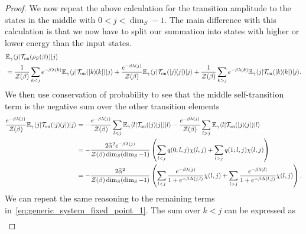 \documentclass{article}
\newcommand{\on}{\rm on}
\newcommand{\ket}[1]{|#1\rangle}
\newcommand{\bra}[1]{\langle #1|}
\newcommand{\ketbra}[2]{| #1\rangle\! \langle #2|}
\newcommand{\partfun}{\mathcal{Z}}
\begin{document}
\begin{proof}
We now repeat the above calculation for the transition amplitude to the states in the middle with $0 < j < \dim_S - 1$. The main difference with this calculation is that we now have to split our summation into states with higher or lower energy than the input states. 
\begin{align}
    &\mathbb{E}_{\gamma} \bra{j} \mathcal{T}_{\on}(\rho_S(\beta)) \ket{j} \nonumber \\
    &= \frac{1}{\partfun(\beta)} \sum_{k < j} e^{-\beta \lambda(k)} \mathbb{E}_{\gamma} \bra{j} \mathcal{T}_{\on}(\ketbra{k}{k}) \ket{j} + \frac{e^{-\beta \lambda(j)}}{\partfun(\beta)} \mathbb{E}_{\gamma}\bra{j} \mathcal{T}_{\on} (\ketbra{j}{j}) \ket{j} + \frac{1}{\partfun(\beta)} \sum_{k > j} e^{-\beta \lambda(k)} \mathbb{E}_{\gamma} \bra{j} \mathcal{T}_{\on} (\ketbra{k}{k}) \ket{j}. \label{eq:generic_system_fixed_point_1}
\end{align}
We then use conservation of probability to see that the middle self-transition term is the negative sum over the other transition elements
\begin{align}
    \frac{e^{-\beta \lambda(j)}}{\partfun(\beta)} \mathbb{E}_{\gamma}\bra{j} \mathcal{T}_{\on} (\ketbra{j}{j}) \ket{j} &= - \frac{e^{-\beta \lambda(j)}}{\partfun(\beta)} \sum_{l < j} \mathbb{E}_{\gamma} \bra{l} \mathcal{T}_{\on} (\ketbra{j}{j}) \ket{l} - \frac{e^{-\beta \lambda(j)}}{\partfun(\beta)} \sum_{l > j} \mathbb{E}_{\gamma} \bra{l} \mathcal{T}_{\on} (\ketbra{j}{j}) \ket{l} \\
    &= -  \frac{2 \widetilde{\alpha}^2 e^{-\beta \lambda(j)} }{\partfun(\beta) \dim_S(\dim_S - 1)} \left( \sum_{l < j} q(0; l, j) \chi(l, j) + \sum_{l > j} q(1; l, j) \chi(l, j) \right) \\
    &= -  \frac{2 \widetilde{\alpha}^2  }{\partfun(\beta) \dim_S(\dim_S - 1)} \left( \sum_{l < j} \frac{e^{-\beta \lambda(j)}}{1 + e^{-\beta \Delta(j, l)}} \chi(l, j) + \sum_{l > j} \frac{e^{-\beta \lambda(l)}}{1 + e^{-\beta \Delta(l, j)}} \chi(l, j) \right). \label{eq:generic_system_fixed_point_2}
\end{align}
We can repeat the same reasoning to the remaining terms in~\eqref{eq:generic_system_fixed_point_1}.  The sum over $k<j$ can be expressed as 
\begin{align}

\end{align}
\end{proof}
\end{document}
